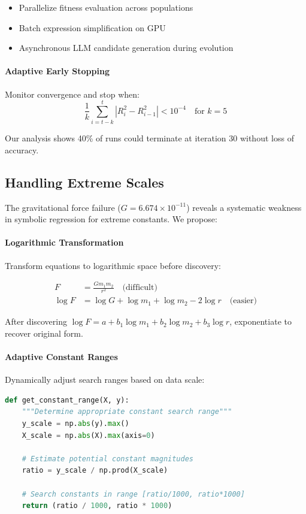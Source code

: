 \begin{itemize}
    \item Parallelize fitness evaluation across populations
    \item Batch expression simplification on GPU
    \item Asynchronous LLM candidate generation during evolution
\end{itemize}

\paragraph{Adaptive Early Stopping}
Monitor convergence and stop when:
\begin{equation}
\frac{1}{k}\sum_{i=t-k}^{t} |R^2_i - R^2_{i-1}| < 10^{-4} \quad \text{for } k = 5
\end{equation}

Our analysis shows 40\% of runs could terminate at iteration 30 without loss of accuracy.

\subsection{Handling Extreme Scales}

The gravitational force failure ($G = 6.674 \times 10^{-11}$) reveals a systematic weakness in symbolic regression for extreme constants. We propose:

\paragraph{Logarithmic Transformation}
Transform equations to logarithmic space before discovery:

\begin{align}
F &= \frac{Gm_1m_2}{r^2} \quad \text{(difficult)} \\
\log F &= \log G + \log m_1 + \log m_2 - 2\log r \quad \text{(easier)}
\end{align}

After discovering $\log F = a + b_1 \log m_1 + b_2 \log m_2 + b_3 \log r$, exponentiate to recover original form.

\paragraph{Adaptive Constant Ranges}
Dynamically adjust search ranges based on data scale:

\begin{lstlisting}[language=Python, caption=Adaptive Constant Search]
def get_constant_range(X, y):
    """Determine appropriate constant search range"""
    y_scale = np.abs(y).max()
    X_scale = np.abs(X).max(axis=0)
    
    # Estimate potential constant magnitudes
    ratio = y_scale / np.prod(X_scale)
    
    # Search constants in range [ratio/1000, ratio*1000]
    return (ratio / 1000, ratio * 1000)
\end{lstlisting}

